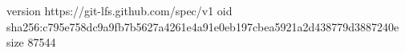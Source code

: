 version https://git-lfs.github.com/spec/v1
oid sha256:c795e758dc9a9fb7b5627a4261e4a91e0eb197cbea5921a2d438779d3887240e
size 87544
